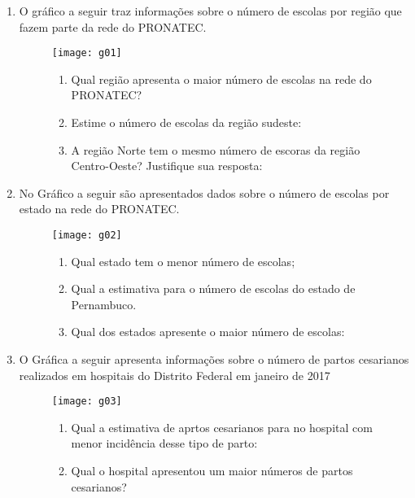 \documentclass[oneside,a4paper,12pt]{article}
\begin{document}
\begin{enumerate}

\item O gráfico a seguir traz informações sobre o número de escolas por região que fazem parte da rede do PRONATEC.

\begin{figure}[!hbt]
\begin{multicols}{2}
\texttt{[image: g01]}

\columnbreak
\begin{enumerate}
\item Qual região apresenta o maior número de escolas na rede do PRONATEC?
\item Estime o número de escolas da região sudeste:
\item A região Norte tem o mesmo número de escoras da região Centro-Oeste? Justifique sua resposta:
\end{enumerate}
\end{multicols}
\end{figure}

\item No Gráfico a seguir são apresentados dados sobre o número de escolas por estado na rede do PRONATEC.

\begin{figure}[!hbt]
\begin{multicols}{2}
\texttt{[image: g02]}

\columnbreak
\begin{enumerate}
\item Qual estado tem o menor número de escolas;
\item Qual a estimativa para o número de escolas do estado de Pernambuco.
\item Qual dos estados apresente o maior número de escolas:
\end{enumerate}
\end{multicols}
\end{figure}

\item O Gráfica a seguir apresenta informações sobre o número de partos cesarianos realizados em hospitais do Distrito Federal em janeiro de 2017

\begin{figure}[!hbt]
\begin{multicols}{2}
\texttt{[image: g03]}

\columnbreak
\begin{enumerate}
\item Qual a estimativa de aprtos cesarianos para no hospital com menor incidência desse tipo de parto:
\item Qual o hospital apresentou um maior números de partos cesarianos? 
\end{enumerate}
\end{multicols}
\end{figure}


\end{enumerate}
\end{document}

